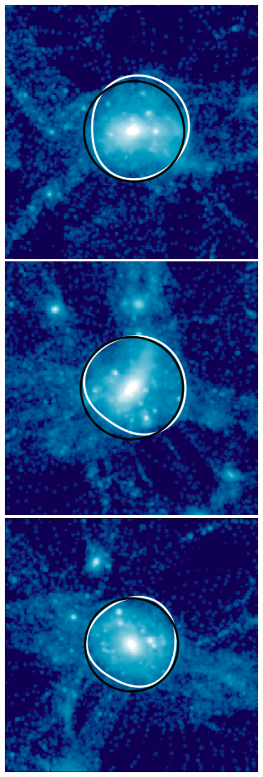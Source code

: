 \documentclass[numberedappendix,apj]{emulateapj}
\begin{document}
\begin{figure}
   \centering
   \includegraphics[width=0.7\columnwidth]{example_halos/pass_ex1.png}
   \hspace{0.4cm}
   \includegraphics[width=0.7\columnwidth]{example_halos/pass_ex2.png}\\
   \vspace{0.5cm}
   \includegraphics[width=0.7\columnwidth]{example_halos/pass_ex3.png}

\end{figure}
\end{document}
